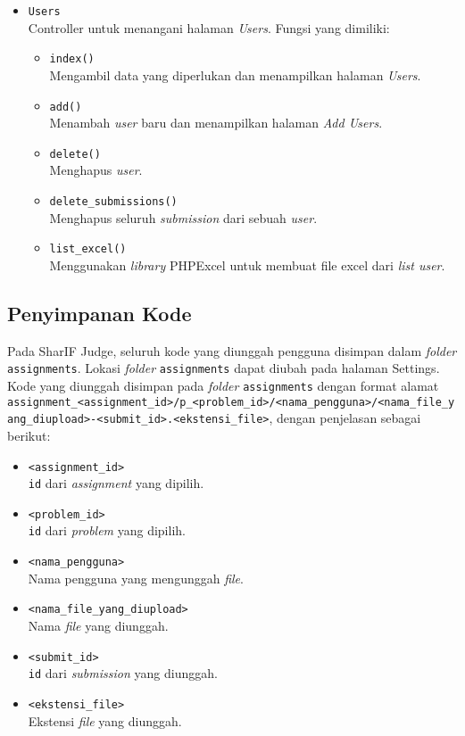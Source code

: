 \begin{itemize}
	\item \verb|Users| \\ Controller untuk menangani halaman \textit{Users}. Fungsi yang dimiliki:
	\begin{itemize}
        \item \verb|index()| \\ Mengambil data yang diperlukan dan menampilkan halaman \textit{Users}.
        \item \verb|add()| \\ Menambah \textit{user} baru dan menampilkan halaman \textit{Add Users}.
        \item \verb|delete()| \\ Menghapus \textit{user}.
        \item \verb|delete_submissions()| \\ Menghapus seluruh \textit{submission} dari sebuah \textit{user}.
         \item \verb|list_excel()| \\ Menggunakan \textit{library} PHPExcel untuk membuat file excel dari \textit{list user}.
	\end{itemize}
\end{itemize}

\subsection{Penyimpanan Kode}
\label{subsec:3:simpan}

Pada SharIF Judge, seluruh kode yang diunggah pengguna disimpan dalam \textit{folder} \verb|assignments|. Lokasi \textit{folder} \verb|assignments| dapat diubah pada halaman Settings. Kode yang diunggah disimpan pada \textit{folder} \verb|assignments| dengan format alamat \lstinline{assignment_<assignment_id>/p_<problem_id>/<nama_pengguna>/<nama_file_yang_diupload>-<submit_id>.<ekstensi_file>}, dengan penjelasan sebagai berikut:
\begin{itemize}
    \item \verb|<assignment_id>| \\ \verb|id| dari \textit{assignment} yang dipilih.
    \item \verb|<problem_id>| \\ \verb|id| dari \textit{problem} yang dipilih.
    \item \verb|<nama_pengguna>| \\ Nama pengguna yang mengunggah \textit{file}.
    \item \verb|<nama_file_yang_diupload>| \\ Nama \textit{file} yang diunggah.
    \item \verb|<submit_id>| \\ \verb|id| dari \textit{submission} yang diunggah.
    \item \verb|<ekstensi_file>| \\ Ekstensi \textit{file} yang diunggah.
\end{itemize}

